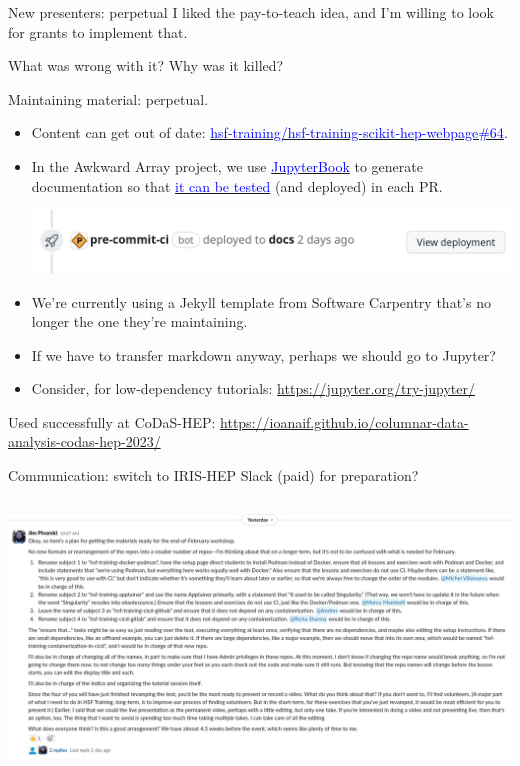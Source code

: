 \documentclass[aspectratio=169]{beamer}
\begin{document}
\begin{frame}{New presenters: perpetual}
\vspace{0.5 cm}
I liked the pay-to-teach idea, and I'm willing to look for grants to implement that.

\vspace{1 cm}
What was wrong with it? Why was it killed?
\end{frame}

\begin{frame}{Maintaining material: perpetual.}
\vspace{0.5 cm}
\begin{itemize}\setlength{\itemsep}{0.2 cm}
\item Content can get out of date: \href{https://github.com/hsf-training/hsf-training-scikit-hep-webpage/pull/64}{\textcolor{blue}{hsf-training/hsf-training-scikit-hep-webpage\#64}}.
\item In the Awkward Array project, we use \href{https://jupyterbook.org/}{\textcolor{blue}{JupyterBook}} to generate documentation so that \href{https://github.com/scikit-hep/awkward/actions/workflows/docs.yml}{\textcolor{blue}{it can be tested}} (and deployed) in each PR.
\begin{center}
\includegraphics[width=0.75\linewidth]{view-deployment.png}
\end{center}
\item We're currently using a Jekyll template from Software Carpentry that's no longer the one they're maintaining.
\item If we have to transfer markdown anyway, perhaps we should go to Jupyter?
\item Consider, for low-dependency tutorials: \textcolor{blue}{\small\url{https://jupyter.org/try-jupyter/}}
\end{itemize}

\vspace{0.25 cm}
\small
Used successfully at CoDaS-HEP: \textcolor{blue}{\url{https://ioanaif.github.io/columnar-data-analysis-codas-hep-2023/}}
\end{frame}

\begin{frame}{Communication: switch to IRIS-HEP Slack (paid) for preparation?}
\vspace{0.35 cm}
\begin{columns}
\includegraphics[width=\linewidth]{big-slack-comments.png}
\end{columns}
\end{frame}
\end{document}
